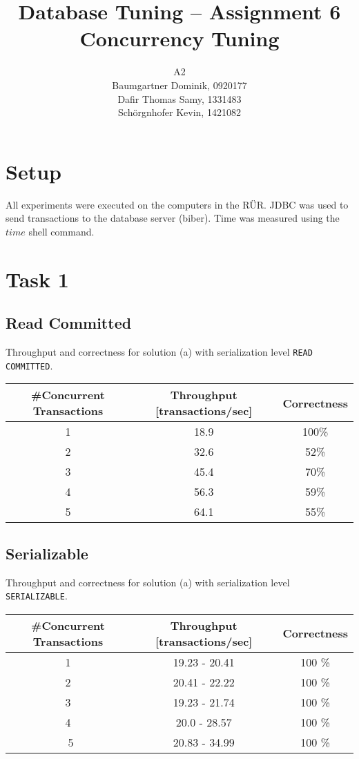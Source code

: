 \documentclass[11pt]{scrartcl}
\title{
  \textbf{\large Database Tuning -- Assignment 6}\\
  Concurrency Tuning
}
\author{
A2\\
\large Baumgartner Dominik, 0920177 \\
\large Dafir Thomas Samy, 1331483 \\
\large Sch\"orgnhofer Kevin, 1421082 
}
\begin{document}
\maketitle

\section*{Setup}
All experiments were executed on the computers in the R\"UR. JDBC was used to send
transactions to the database server (biber). Time was measured using the $time$ shell command.

\section*{Task 1}

\subsection*{Read Committed}

Throughput and correctness for solution (a) with serialization level
{\tt\small READ COMMITTED}.

\bigskip

\begin{tabular}{c|c|c}
  \#Concurrent Transactions & Throughput [transactions/sec] & Correctness
  \\\hline
  1 & 18.9 & 100\% \\
  2 & 32.6 & 52\% \\
  3 & 45.4 & 70\% \\
  4 & 56.3 & 59\% \\
  5 & 64.1 & 55\% \\    
\end{tabular}

\medskip

\subsection*{Serializable}

Throughput and correctness for solution (a) with serialization level
{\tt\small SERIALIZABLE}.

\bigskip

\begin{tabular}{c|c|c}
  \#Concurrent Transactions & Throughput [transactions/sec] & Correctness
  \\\hline
   1 & 19.23 - 20.41 & 100 \% \\
  2 & 20.41 - 22.22 & 100 \% \\
  3 & 19.23 - 21.74 & 100 \%\\
  4 & 20.0 - 28.57& 100 \%\\\
  5 & 20.83 - 34.99 & 100 \% \\  
\end{tabular}
\end{document}
